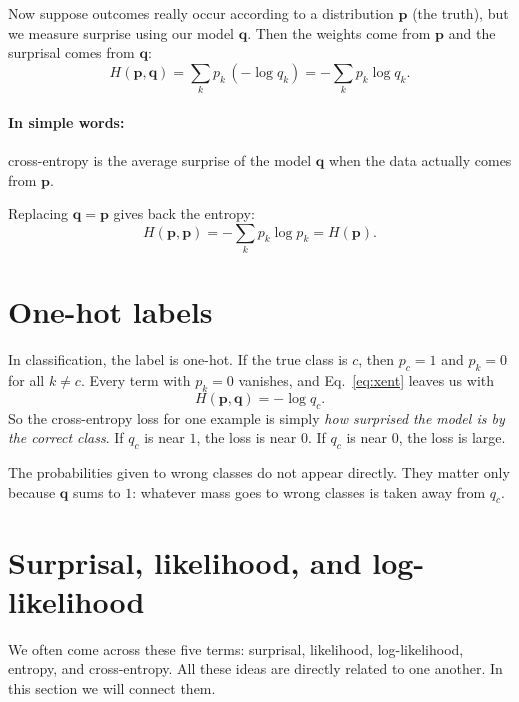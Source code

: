 \documentclass[12pt,a4paper]{article}
\begin{document}
Now suppose outcomes really occur according to a
distribution $\symbf{p}$ (the truth), but we measure
surprise using our model $\symbf{q}$. Then the weights
come from $\symbf{p}$ and the surprisal comes
from $\symbf{q}$:
\begin{equation}
    H(\symbf{p}, \symbf{q}) = \sum_{k} p_k \,(-\log q_k) = -\sum_{k} p_k \log q_k .
    \label{eq:xent}
\end{equation}
\paragraph{In simple words:}
cross-entropy is the average surprise
of the model $\symbf{q}$ when the data actually comes
from $\symbf{p}$.

Replacing $\symbf{q} = \symbf{p}$ gives back
the entropy:
\begin{equation}
    H(\symbf{p}, \symbf{p}) = -\sum_{k} p_k \log p_k = H(\symbf{p}).
    \label{eq:xent-self}
\end{equation}

\section{One-hot labels}

In classification, the label is one-hot. If the true
class is $c$, then $p_c = 1$ and $p_k = 0$ for all
$k \neq c$. Every term with $p_k = 0$ vanishes,
and Eq.~\eqref{eq:xent} leaves us with
\begin{equation}
  H(\symbf{p}, \symbf{q}) = -\log q_c .
  \label{eq:onehot}
\end{equation}
So the cross-entropy loss for one example is simply
\emph{how surprised the model is by the correct class}.
If $q_c$ is near $1$, the loss is near $0$.
If $q_c$ is near $0$, the loss is large.

The probabilities given to wrong classes do not appear
directly. They matter only because $\symbf{q}$ sums
to $1$: whatever mass goes to wrong classes is
taken away from $q_c$.

\section{Surprisal, likelihood, and log-likelihood}

We often come across these five terms: surprisal,
likelihood, log-likelihood, entropy, and cross-entropy.
All these ideas are directly related to one another.
In this section we will connect them.
\end{document}
